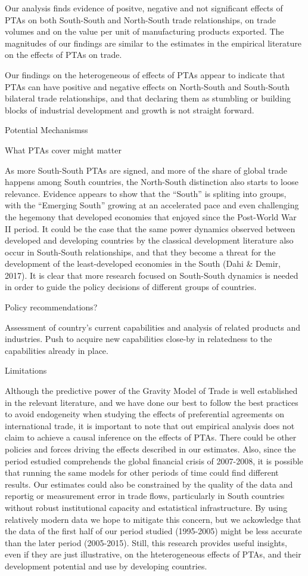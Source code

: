 Our analysis finds evidence of positve, negative and not significant
effects of PTAs on both South-South and North-South trade relationships,
on trade volumes and on the value per unit of manufacturing products
exported. The magnitudes of our findings are similar to the estimates in
the empirical literature on the effects of PTAs on trade.

Our findings on the heterogeneous of effects of PTAs appear to indicate
that PTAs can have positive and negative effects on North-South and
South-South bilateral trade relationships, and that declaring them as
stumbling or building blocks of industrial development and growth is not
straight forward.

Potential Mechanismss

What PTAs cover might matter

As more South-South PTAs are signed, and more of the share of global
trade happens among South countries, the North-South distinction also
starts to loose relevance. Evidence appears to show that the ``South''
is spliting into groups, with the ``Emerging South'' growing at an
accelerated pace and even challenging the hegemony that developed
economies that enjoyed since the Post-World War II period. It could be
the case that the same power dynamics observed between developed and
developing countries by the classical development literature also occur
in South-South relationships, and that they become a threat for the
development of the least-developed economies in the South (Dahi \&
Demir, 2017). It is clear that more research focused on South-South
dynamics is needed in order to guide the policy decisions of different
groups of countries.

Policy recommendations?

Assessment of country's current capabilities and analysis of related
products and industries. Push to acquire new capabilities close-by in
relatedness to the capabilities already in place.

Limitations

Although the predictive power of the Gravity Model of Trade is well
established in the relevant literature, and we have done our best to
follow the best practices to avoid endogeneity when studying the effects
of preferential agreements on international trade, it is important to
note that out empirical analysis does not claim to achieve a causal
inference on the effects of PTAs. There could be other policies and
forces driving the effects described in our estimates. Also, since the
period estudied comprehends the global financial crisis of 2007-2008, it
is possible that running the same models for other periods of time could
find different results. Our estimates could also be constrained by the
quality of the data and reportig or measurement error in trade flows,
particularly in South countries without robust institutional capacity
and estatistical infrastructure. By using relatively modern data we hope
to mitigate this concern, but we ackowledge that the data of the first
half of our period studied (1995-2005) might be less accurate than the
later period (2005-2015). Still, this research provides useful insights,
even if they are just illustrative, on the hteterogeneous effects of
PTAs, and their development potential and use by developing countries.